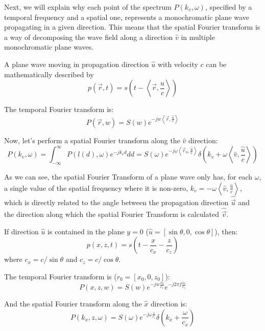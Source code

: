 Next, we will explain why each point of the spectrum $P(k_v, \omega)$, specified by a temporal frequency and a spatial one, represents a monochromatic plane wave propagating in a given direction. This means that the spatial Fourier transform is a way of decomposing the wave field along a direction $\hat{v}$ in multiple monochromatic plane waves.

A plane wave moving in propagation direction $\hat{u}$ with velocity $c$ can be mathematically described by
\begin{equation}
p(\vec{r}, t) = s\left(t - \left<\vec{r}, \frac{\hat{u}}{c}\right>\right)
\end{equation}

The temporal Fourier transform is:
\begin{equation}
P(\vec{r}, w) = S(w) e^{-j w \left<\vec{r}, \frac{\hat{u}}{c}\right>}
\end{equation}

Now, let's perform a spatial Fourier transform along the $\hat{v}$ direction:
\begin{equation}
P(k_v, \omega) = \int_{-\infty}^{\infty} P(l(d), \omega) e^{-j k_v d} dd = S(\omega) e^{-j \omega \left<\vec{r}_0, \frac{\hat{u}}{c}\right>} \delta\left( k_v + \omega\left<\hat{v}, \frac{\hat{u}}{c}\right> \right)
\end{equation}

As we can see, the spatial Fourier Transform of a plane wave only has, for each $\omega$, a single value of the spatial frequency where it is non-zero, $k_v = -\omega\left<\hat{v}, \frac{\hat{u}}{c}\right>$, which is directly related to the angle between the propagation direction $\hat{\vec{u}}$ and the direction along which the spatial Fourier Transform is calculated $\hat{\vec{v}}$.

If direction $\hat{u}$ is contained in the plane $y=0$ ($\hat{u} = [\sin\theta, 0, \cos\theta]$), then:
\begin{equation}
p(x, z, t) = s\left(t - \frac{x}{c_x} - \frac{z}{c_z}\right)
\end{equation}
where $c_x = c/\sin\theta$ and $c_z = c/\cos\theta$.

The temporal Fourier transform is ($r_0 = [x_0, 0, z_0]$):
\begin{equation}
P(x, z, w) = S(w) e^{-j w \frac{x_0}{c_x}} e^{-j 2 \pi f \frac{z_0}{c_z}}
\end{equation}

And the spatial Fourier transform along the $\hat{x}$ direction is:
\begin{equation}
P(k_x, z, \omega) = S(\omega) e^{-j \omega \frac{z}{c_z}} \delta\left(k_x + \frac{\omega}{c_x}\right)
\end{equation}

